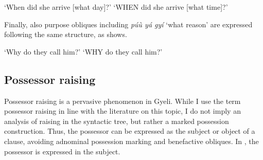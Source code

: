 \ea\label{with}
    \trans `When did she arrive [what day]?'
    \trans `WHEN did she arrive [what time]?'
\z
\z 

\noindent Finally, also purpose obliques including {\itshape púù yá gyí} `what reason' are expressed following the same structure, as  shows.

\ea\label{QPur}
    \trans `Why do they call him?'
    \trans `WHY do they call him?'
\z
\z 





\subsection{Possessor raising}
\label{sec:PossR}

Possessor raising is a pervasive phenomenon in Gyeli. While I use the term possessor raising in line with the literature on this topic, I do not imply an analysis of raising in the syntactic tree, but rather a marked possession construction.  Thus, the possessor can be expressed as the subject or object of a clause, avoiding adnominal possession marking and benefactive obliques.  In , the possessor is expressed in the subject.


